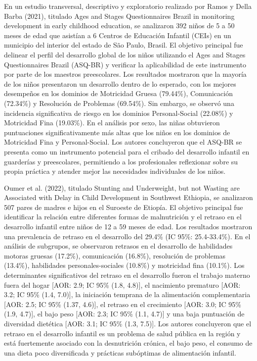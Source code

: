 \documentclass[11pt,letterpaper]{report}
\begin{document}
En un estudio transversal, descriptivo y exploratorio realizado por Ramos y
Della Barba (2021), titulado Ages and Stages Questionnaires Brazil in
monitoring development in early childhood education, se analizaron 392 niños de     5 a 50 meses de edad que asistían a 6 Centros de Educación Infantil (CEIs) en       un municipio del interior del estado de São Paulo, Brasil. El objetivo              principal fue delinear el perfil del desarrollo global de los niños utilizando      el Ages and Stages Questionnaires Brazil (ASQ-BR) y verificar la aplicabilidad      de este instrumento por parte de los maestros preescolares. Los resultados          mostraron que la mayoría de los niños presentaron un desarrollo dentro de lo        esperado, con los mejores desempeños en los dominios de Motricidad Gruesa           (79.44\%), Comunicación (72.34\%) y Resolución de Problemas (69.54\%). Sin          embargo, se observó una incidencia significativa de riesgo en los dominios          Personal-Social (22.08\%) y Motricidad Fina (19.03\%). En el análisis por sexo,     las niñas obtuvieron puntuaciones significativamente más altas que los niños en     los dominios de Motricidad Fina y Personal-Social. Los autores concluyeron que      el ASQ-BR se presenta como un instrumento potencial para el cribado del             desarrollo infantil en guarderías y preescolares, permitiendo a los                 profesionales reflexionar sobre su propia práctica y atender mejor las
necesidades individuales de los niños. \cite{RAMOS2021}

Oumer et al. (2022), titulado Stunting and Underweight, but not Wasting are
Associated with Delay in Child Development in Southwest Ethiopia, se analizaron
507 pares de madres e hijos en el Suroeste de Etiopía. El objetivo principal
fue identificar la relación entre diferentes formas de malnutrición y el
retraso en el desarrollo infantil entre niños de 12 a 59 meses de edad. Los
resultados mostraron una prevalencia de retraso en el desarrollo del 29.4\% (IC
95\%: 25.4-33.4\%). En el análisis de subgrupos, se observaron retrasos en el
desarrollo de habilidades motoras gruesas (17.2\%), comunicación (16.8\%),
resolución de problemas (13.4\%), habilidades personales-sociales (10.8\%) y
motricidad fina (10.1\%). Los determinantes significativos del retraso en el
desarrollo fueron el trabajo materno fuera del hogar [AOR: 2.9; IC 95\% (1.8,
4.8)], el nacimiento prematuro [AOR: 3.2; IC 95\% (1.4, 7.0)], la iniciación
temprana de la alimentación complementaria [AOR: 2.5; IC 95\% (1.37, 4.6)], el
retraso en el crecimiento [AOR: 3.0; IC 95\% (1.9, 4.7)], el bajo peso [AOR:
2.3; IC 95\% (1.1, 4.7)] y una baja puntuación de diversidad dietética [AOR:
3.1; IC 95\% (1.3, 7.5)]. Los autores concluyeron que el retraso en el
desarrollo infantil es un problema de salud pública en la región y está
fuertemente asociado con la desnutrición crónica, el bajo peso, el consumo de
una dieta poco diversificada y prácticas subóptimas de alimentación infantil.
\cite{Oumer2022}
\end{document}
